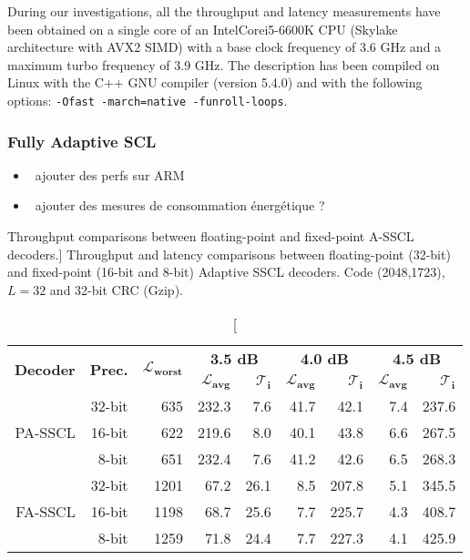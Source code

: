 During our investigations, all the throughput and latency measurements have been
obtained on a single core of an Intel\R Core\TM i5-6600K CPU (Skylake
architecture with AVX2 SIMD) with a base clock frequency of 3.6 GHz and a
maximum turbo frequency of 3.9 GHz. The description has been compiled on Linux
with the C++ GNU compiler (version 5.4.0) and with the following options:
\verb|-Ofast -march=native -funroll-loops|.

\subsubsection{Fully Adaptive SCL}

\begin{itemize}
  \item \xmark~ajouter des perfs sur ARM
  \item \xmark~ajouter des mesures de consommation énergétique ?
\end{itemize}

\begin{table}[htp]
  \centering
  \caption
    [Throughput comparisons between floating-point and fixed-point A-SSCL
     decoders.]
    {Throughput and latency comparisons between floating-point (32-bit) and
    fixed-point (16-bit and 8-bit) Adaptive SSCL decoders. Code (2048,1723),
    $L = 32$ and 32-bit CRC (Gzip).}
  \label{tab:eval_polar_scl_perfs_fixed}
  \begin{tabular}{r  r  r  r  r |  r  r | r  r}
    \multirow{2}{*}{\textbf{Decoder}} & \multirow{2}{*}{\textbf{Prec.}} & \multirow{2}{*}{$\bm{\mathcal{L}_{worst}}$} & \multicolumn{2}{c|}{\textbf{3.5 dB}} & \multicolumn{2}{c|}{\textbf{4.0 dB}} & \multicolumn{2}{c}{\textbf{4.5 dB}} \\
    \cline{4-9}
    & & & $\bm{\mathcal{L}_{avg}}$ & $\bm{\mathcal{T}_i}$ & $\bm{\mathcal{L}_{avg}}$ & $\bm{\mathcal{T}_i}$ & $\bm{\mathcal{L}_{avg}}$ & $\bm{\mathcal{T}_i}$ \\
    \hline
    \hline
    \multirow{3}{*}{PA-SSCL} & 32-bit &  635 & 232.3 &   7.6 & 41.7 &  42.1 & 7.4 & 237.6 \\
                             & 16-bit &  622 & 219.6 &   8.0 & 40.1 &  43.8 & 6.6 & 267.5 \\
                             &  8-bit &  651 & 232.4 &   7.6 & 41.2 &  42.6 & 6.5 & 268.3 \\
    \hline
    \multirow{3}{*}{FA-SSCL} & 32-bit & 1201 &  67.2 &  26.1 &  8.5 & 207.8 & 5.1 & 345.5 \\
                             & 16-bit & 1198 &  68.7 &  25.6 &  7.7 & 225.7 & 4.3 & 408.7 \\
                             &  8-bit & 1259 &  71.8 &  24.4 &  7.7 & 227.3 & 4.1 & 425.9 \\
  \end{tabular}
\end{table}

